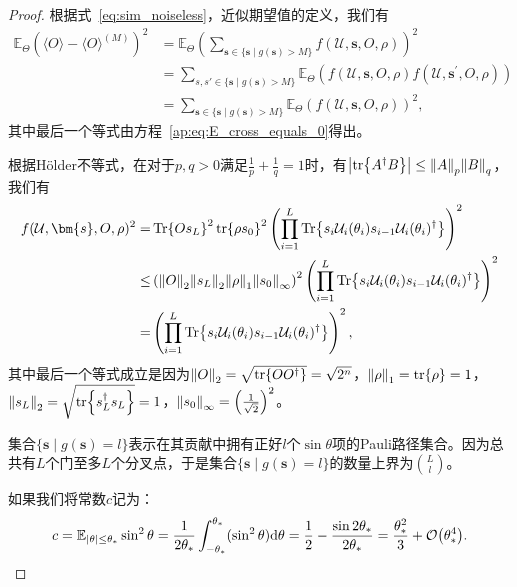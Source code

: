 \begin{proof}
    根据式~\eqref{eq:sim_noiseless}，近似期望值的定义，我们有
    \begin{equation}
        \begin{aligned}
        \mathbb{E}_{\Theta}\left(\langle O \rangle - \langle O \rangle ^{(M)}\right)^2 &= \mathbb{E}_{\Theta}\left(\sum_{\bm{s}\in \{\bm{s}\mid g(\bm{s})> M\}} f(\mathcal{U},\bm{s},O,\rho)\right)^2\\
        &=\sum_{s,s'\in\{\bm{s}\mid g(\bm{s})> M\}} \mathbb{E}_{\Theta}\left(f(\mathcal{U},\bm{s},O,\rho)f(\mathcal{U},\bm{s}^\prime,O,\rho) \right)\\
        &=\sum_{\bm{s}\in \{\bm{s}\mid g(\bm{s}) > M\}} \mathbb{E}_{\Theta}\left(f(\mathcal{U},\bm{s},O,\rho)\right)^2,
      \end{aligned}
    \end{equation}
    其中最后一个等式由方程~\eqref{ap:eq:E_cross_equals_0}得出。

    根据Hölder不等式，在对于$p,q>0$满足$\frac{1}{p}+\frac{1}{q}=1$时，有$\abs{\tr{A^\dagger B}}\leq \norm{A}_p\norm{B}_q$，我们有
    \begin{equation}
        \begin{aligned}
            f(\mathcal{U},\bm{s},O,\rho)^2=&\Tr{Os_L}^2\tr{\rho s_0}^2\left(\prod_{i=1}^{L}\Tr{s_i\mathcal{U}_i(\theta_i) s_{i-1}\mathcal{U}_i(\theta_i)^\dagger}\right)^2\\
        \leq & \left(\norm{O}_2\norm{s_L}_2 \norm{\rho}_1\norm{s_0}_\infty\right)^2  \left(\prod_{i=1}^{L}\Tr{s_i\mathcal{U}_i(\theta_i) s_{i-1}\mathcal{U}_i(\theta_i)^\dagger}\right)^2\\
        =& \left(\prod_{i=1}^{L}\Tr{s_i\mathcal{U}_i(\theta_i) s_{i-1}\mathcal{U}_i(\theta_i)^\dagger}\right)^2,
        \end{aligned}
    \end{equation}
    其中最后一个等式成立是因为$\norm{O}_2=\sqrt{\tr{OO^\dagger}}=\sqrt{2^n}$，$\norm{\rho}_1=\tr{\rho}=1$，$\norm{s_L}_2=\sqrt{\tr{s_L^\dagger s_L}}=1$，$\norm{s_0}_\infty=\left(\frac{1}{\sqrt{2}}\right)^2$。

    集合$\{\bm{s}\mid g(\bm{s})=l\}$表示在其贡献中拥有正好$l$个$\sin{\theta}$项的Pauli路径集合。因为总共有$L$个门至多$L$个分叉点，于是集合$\{\bm{s}\mid g(\bm{s})= l\}$的数量上界为$\binom{L}{l}$。

    如果我们将常数$c$记为：
    \begin{equation}
        c=\mathbb{E}_{\abs{\theta}\leq \theta_*}\sin^2{\theta}=\frac{1}{2\theta_*} \int_{-\theta_*}^{\theta_*}(\sin^2{\theta})\mathrm{d}\theta= \frac{1}{2}-\frac{\sin{2\theta_*}}{2\theta_*}=\frac{ \theta_*^2}{3}+\order{\theta_*^4}.
    \end{equation}


\end{proof}
